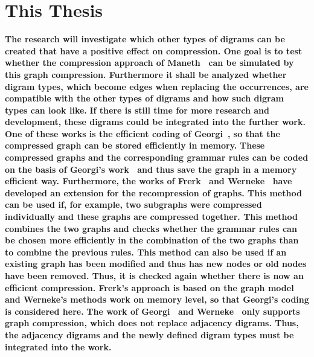 \documentclass[a4paper]{scrartcl}
\newcommand{\asd}[1]{\textbf{#1}}
\begin{document}
\section{This Thesis}
\asd{
The research will investigate which other types of digrams can be created that have a positive effect on compression. One goal is to test whether the compression approach of Maneth~\cite{maneth} can be simulated by this graph compression. Furthermore it shall be analyzed whether digram types, which become edges when replacing the occurrences, are compatible with the other types of digrams and how such digram types can look like.
}
\asd{
If there is still time for more research and development, these digrams could be integrated into the further work. One of these works is the efficient coding of Georgi~\cite{georgi}, so that the compressed graph can be stored efficiently in memory.
}\asd{
These compressed graphs and the corresponding grammar rules can be coded on the basis of Georgi's work~\cite{georgi} and thus save the graph in a memory efficient way.
Furthermore, the works of Frerk~\cite{pfrerk} and Werneke~\cite{werneke} have developed an extension for the recompression of graphs. This method can be used if, for example, two subgraphs were compressed individually and these graphs are compressed together. This method combines the two graphs and checks whether the grammar rules can be chosen more efficiently in the combination of the two graphs than to combine the previous rules. This method can also be used if an existing graph has been modified and thus has new nodes or old nodes have been removed. Thus, it is checked again whether there is now an efficient compression.
Frerk's approach is based on the graph model and Werneke's methods work on memory level, so that Georgi's coding is considered here.
}\asd{
The work of Georgi~\cite{georgi} and Werneke~\cite{werneke} only supports graph compression, which does not replace adjacency digrams. Thus, the adjacency digrams and the newly defined digram types must be integrated into the work.
}

\pagebreak
\printbibliography
\end{document}
